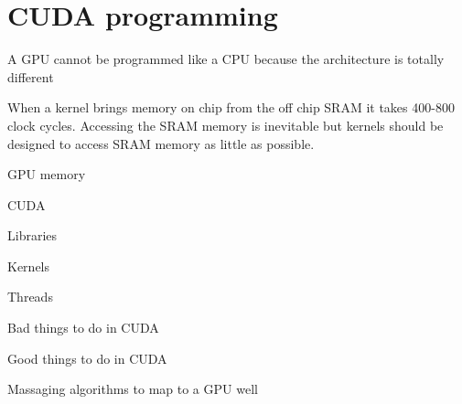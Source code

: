 \section{CUDA programming}
A GPU cannot be programmed like a CPU because the architecture is totally different

When a kernel brings memory on chip from the off chip SRAM it takes 400-800 clock cycles.
Accessing the SRAM memory is inevitable but kernels should be designed to access SRAM memory as little as possible.

GPU memory

CUDA

Libraries

Kernels

Threads

Bad things to do in CUDA

Good things to do in CUDA

Massaging algorithms to map to a GPU well


